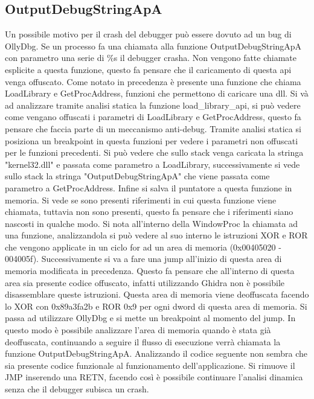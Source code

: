 \documentclass[a4paper,10pt]{article}
\begin{document}
\subsection{OutputDebugStringApA}
Un possibile motivo per il crash del debugger può essere dovuto ad un bug di OllyDbg. Se un processo fa una chiamata alla funzione OutputDebugStringApA con parametro una serie di \%s il debugger crasha. Non vengono fatte chiamate esplicite a questa funzione, questo fa pensare che il caricamento di questa api venga offuscato. Come notato in precedenza è presente una funzione che chiama LoadLibrary e GetProcAddress, funzioni che permettono di caricare una dll. Si và ad analizzare tramite analisi statica la funzione load\_library\_api, si può vedere come vengano offuscati i parametri di LoadLibrary e GetProcAddress, questo fa pensare che faccia parte di un meccanismo anti-debug. Tramite analisi statica si posiziona un breakpoint in questa funzioni per vedere i parametri non offuscati per le funzioni precedenti. Si può vedere che sullo stack venga caricata la stringa "kernel32.dll" e passata come parametro a LoadLibrary, successivamente si vede sullo stack la stringa "OutputDebugStringApA" che viene passata come parametro a GetProcAddress. Infine si salva il puntatore a questa funzione in memoria. Si vede se sono presenti riferimenti in cui questa funzione viene chiamata, tuttavia non sono presenti, questo fa pensare che i riferimenti siano nascosti in qualche modo.  Si nota all'interno della WindowProc la chiamata ad una funzione, analizzandola si può vedere al suo interno le istruzioni XOR e ROR che vengono applicate in un ciclo for ad un area di memoria (0x00405020 - 004005f).
 Successivamente si va a fare una jump all'inizio di questa area di memoria modificata in precedenza. Questo fa pensare che all'interno di questa area sia presente codice offuscato, infatti utilizzando Ghidra non è possibile disassemblare queste istruzioni.  Questa area di memoria viene deoffuscata facendo lo XOR con 0x89a3fa2b e ROR 0x9 per ogni dword di questa area di memoria.
 Si passa ad utilizzare OllyDbg e si mette un breakpoint al momento del jump. In questo modo è possibile analizzare l'area di memoria quando è stata già deoffuscata, continuando a seguire il flusso di esecuzione verrà chiamata la funzione OutputDebugStringApA. Analizzando il codice seguente non sembra che sia presente codice funzionale al funzionamento dell'applicazione. Si rimuove il JMP inserendo una RETN, facendo così è possibile continuare l'analisi dinamica senza che il debugger subisca un crash.
\end{document}
